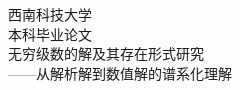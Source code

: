 
\thispagestyle{empty}
\begin{titlepage}
\begin{center}
\vspace*{2cm}
{\heiti 西南科技大学}\\[0.5cm]
{\songti 本科毕业论文}\\[3cm]
{\heiti 无穷级数的解及其存在形式研究}\\[0.3cm]
{\heiti ——从解析解到数值解的谱系化理解}\\[4cm]
\end{center}
\end{titlepage}

\clearpage
